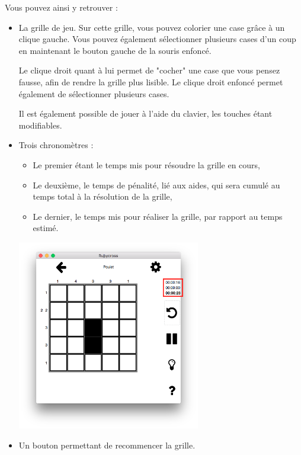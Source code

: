 \documentclass[a4paper, 12pt]{report}
\begin{document}
            Vous pouvez ainsi y retrouver :
            \begin{itemize}
                \item La grille de jeu.
                Sur cette grille, vous pouvez colorier une case grâce à un clique gauche. Vous pouvez également sélectionner plusieurs cases d'un coup en maintenant le bouton gauche de la souris enfoncé.
                
                Le clique droit quant à lui permet de "cocher" une case que vous pensez fausse, afin de rendre la grille plus lisible. Le clique droit enfoncé permet également de sélectionner plusieurs cases.
                
                Il est également possible de jouer à l'aide du clavier, les touches étant modifiables.
                \item Trois chronomètres : 
                \begin{itemize}
                    \item Le premier étant le temps mis pour résoudre la grille en cours,
                    \item Le deuxième, le temps de pénalité, lié aux aides, qui sera cumulé au temps total à la résolution de la grille,
                    \item Le dernier, le temps mis pour réaliser la grille, par rapport au temps estimé.
                \end{itemize}
                \begin{minipage}{\linewidth}
                    \centering
			        \includegraphics[width=8cm]{screenTimer.png}
	            \end{minipage}
                \item Un bouton permettant de recommencer la grille.\\

\end{itemize}
\end{document}
